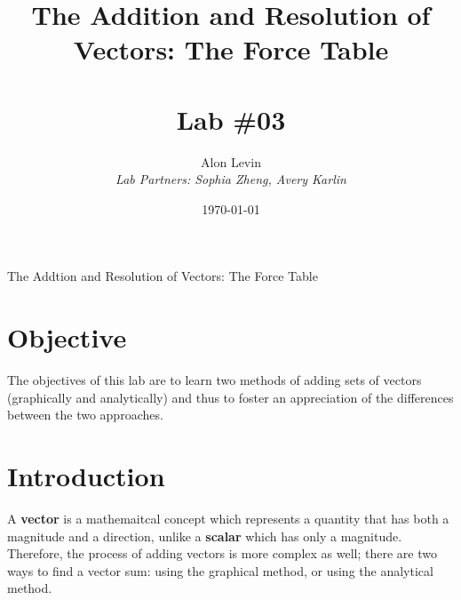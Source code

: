 \documentclass[11pt, titlepage]{article}
\title{\Huge{The Addition and Resolution of Vectors: The Force Table} \\ \ \\ \huge Lab \#03}
\author{\Large{Alon Levin} \\ \emph{Lab Partners: Sophia Zheng, Avery Karlin}}
\date{\today}
\begin{document}
\maketitle

\begin{center}
\LARGE The Addtion and Resolution of Vectors: The Force Table
\end{center}

\section*{Objective}
The objectives of this lab are to learn two methods of adding sets of vectors (graphically and analytically) and thus to foster an appreciation of the differences between the two approaches.

\section*{Introduction}
A \textbf{vector} is a mathemaitcal concept which represents a quantity that has both a magnitude and a direction, unlike a \textbf{scalar} which has only a magnitude. Therefore, the process of adding vectors is more complex as well; there are two ways to find a vector sum: using the graphical method, or using the analytical method. 
\end{document}

